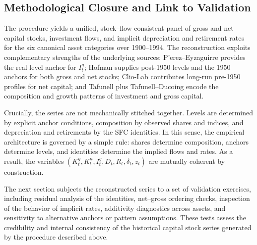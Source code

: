 \documentclass[11pt,a4paper]{article}
\begin{document}
\subsection{Methodological Closure and Link to Validation}\label{subsec:closure}

The procedure yields a unified, stock--flow consistent panel of gross and net capital stocks, investment flows, and implicit depreciation and retirement rates for the six canonical asset categories over 1900--1994. The reconstruction exploits complementary strengths of the underlying sources: P'erez--Eyzaguirre provides the real level anchor for $I_t^{g}$; Hofman supplies post-1950 levels and the 1950 anchors for both gross and net stocks; Clio-Lab contributes long-run pre-1950 profiles for net capital; and Tafunell plus Tafunell--Ducoing encode the composition and growth patterns of investment and gross capital.

Crucially, the series are not mechanically stitched together. Levels are determined by explicit anchor conditions, composition by observed shares and indices, and depreciation and retirements by the SFC identities. In this sense, the empirical architecture is governed by a simple rule: shares determine composition, anchors determine levels, and identities determine the implied flows and rates. As a result, the variables $(K_t^{g},K_t^{n},I_t^{g},D_t,R_t,\delta_t,z_t)$ are mutually coherent by construction.

The next section subjects the reconstructed series to a set of validation exercises, including residual analysis of the identities, net--gross ordering checks, inspection of the behavior of implicit rates, additivity diagnostics across assets, and sensitivity to alternative anchors or pattern assumptions. These tests assess the credibility and internal consistency of the historical capital stock series generated by the procedure described above.




\pagebreak

\end{document}
